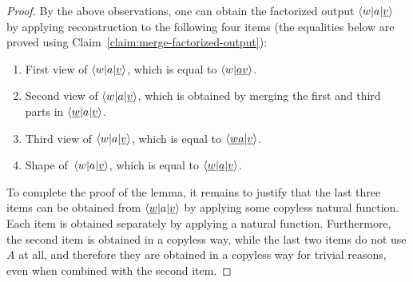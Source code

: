 \begin{proof}
   By the above observations, one can obtain the factorized output $\langle w|a|\underline v \rangle$ by applying reconstruction to the  following four items (the equalities below are proved using  Claim~\ref{claim:merge-factorized-output}):
     \begin{enumerate}
        \item \label{it:first-view}First view of $\langle w|a|\underline v \rangle$, which is equal to $\langle w|\underline {av} \rangle$.
        \item  \label{it:second-view} Second view of $\langle w|a|\underline v \rangle$, which is obtained by merging the first and third parts in $\langle \underline w|a|\underline v \rangle$.
        \item \label{it:third-view}   Third view of $\langle w|a|\underline v \rangle$, which is equal to $\langle \underline {wa}|\underline{v} \rangle$.
        \item   \label{it:shape} Shape of~$\langle w|a|\underline v \rangle$, which is equal to $\langle \underline w|\underline a| \underline v \rangle$.
     \end{enumerate}
     To complete the proof of the lemma, it remains to justify that the last three items can be obtained from $\langle \underline w|a|\underline v \rangle$ by applying some copyless natural function. Each item is obtained separately by applying a natural function. Furthermore, the second item is obtained in a copyless way, while the last two items do not use $A$ at all, and therefore they are obtained in a copyless way for trivial reasons, even when combined with the second item.
\end{proof}


